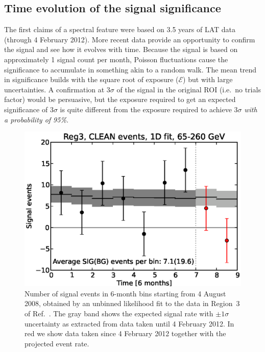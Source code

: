 \documentclass[aps,prd,superscriptaddress,nofootinbib,fixlfloat, 12pt]{revtex4-1}
\begin{document}
\subsection{Time evolution of the signal significance}
The first claims of a spectral feature \citep{Bringmann:2012,Weniger:2012}
were based on 3.5 years of LAT data (through 4 February 2012).  More recent data provide an opportunity to confirm the signal and see how it evolves with
time.  Because the signal is based on approximately 1 signal count per month,
Poisson fluctuations cause the significance to accumulate in
something akin to a random walk.  The mean trend in significance builds with
the square root of exposure ($\mathcal{E}$) but with large uncertainties.  A confirmation at $3\sigma$ of the
signal in the original ROI (i.e.~no trials factor) would be persuasive, but
the exposure required to get an expected significance of $3\sigma$ is quite
different from the exposure required to achieve $3\sigma$ \emph{with a
probability of 95\%.}

\begin{figure}[h]
  \begin{center}
    \includegraphics[width=0.60\linewidth]{plots/semester_fluxes.eps}
    \vspace{-0.5cm}
  \end{center}
  \caption{Number of signal events in 6-month bins starting from 4
    August 2008, obtained by an unbinned likelihood fit to the data in
    Region~3 of Ref.~\cite{Weniger:2012}. The gray band shows the expected
    signal rate with $\pm1\sigma$ uncertainty as extracted from data taken until
    4 February 2012.
    In red we show data taken since 4 February 2012
    together with the projected event rate.}
  \label{fig:semester_fluxes}
\end{figure}
\end{document}
